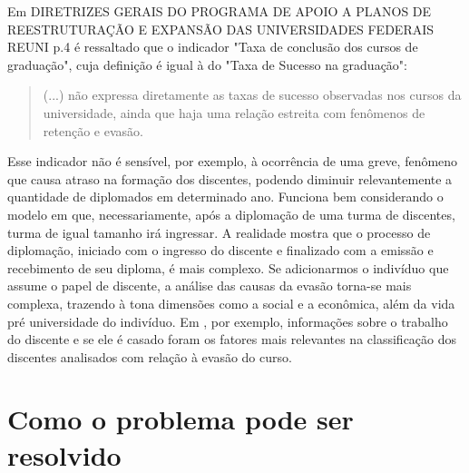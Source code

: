 Em DIRETRIZES GERAIS DO PROGRAMA DE APOIO A PLANOS DE REESTRUTURAÇÃO E EXPANSÃO DAS UNIVERSIDADES FEDERAIS REUNI p.4 é ressaltado que o indicador "Taxa de conclusão dos cursos de graduação", cuja definição é igual à do "Taxa de Sucesso na graduação":

\begin{quote}
(...) não expressa diretamente as taxas de sucesso observadas nos cursos da universidade, ainda que haja uma relação estreita com fenômenos de retenção e evasão.
\end{quote}

Esse indicador não é sensível, por exemplo, à ocorrência de uma greve, fenômeno que causa atraso na formação dos discentes, podendo diminuir relevantemente a quantidade de diplomados em determinado ano. Funciona bem considerando o modelo em que, necessariamente, após a diplomação de uma turma de discentes, turma de igual tamanho irá ingressar. A realidade mostra que o processo de diplomação, iniciado com o ingresso do discente e finalizado com a emissão e recebimento de seu diploma, é mais complexo. Se adicionarmos o indivíduo que assume o papel de discente, a análise das causas da evasão torna-se mais complexa, trazendo à tona dimensões como a social e a econômica, além da vida pré universidade do indivíduo. Em \cite{unioeste}, por exemplo, informações sobre o trabalho do discente e se ele é casado foram os fatores mais relevantes na classificação dos discentes analisados com relação à evasão do curso. 

\section{Como o problema pode ser resolvido}
